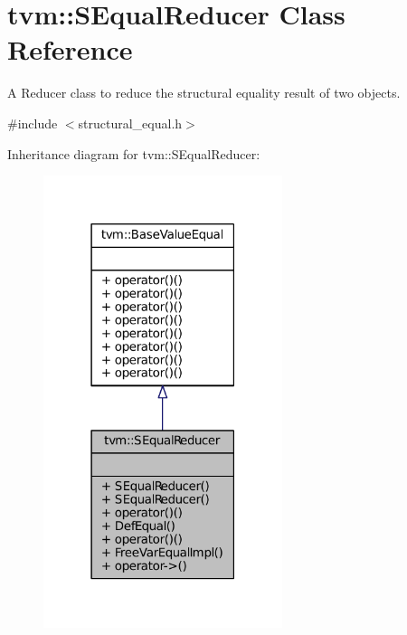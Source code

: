 \hypertarget{classtvm_1_1SEqualReducer}{}\section{tvm\+:\+:S\+Equal\+Reducer Class Reference}
\label{classtvm_1_1SEqualReducer}


A Reducer class to reduce the structural equality result of two objects.  




{\ttfamily \#include $<$structural\+\_\+equal.\+h$>$}



Inheritance diagram for tvm\+:\+:S\+Equal\+Reducer\+:
\nopagebreak
\begin{figure}[H]
\begin{center}
\leavevmode
\includegraphics[width=198pt]{classtvm_1_1SEqualReducer__inherit__graph}
\end{center}
\end{figure}


